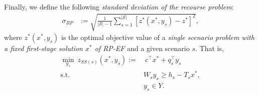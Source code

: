 Finally, we define the following \textit{standard deviation of the recourse problem}:
\begin{align} 
\sigma_{RP}&:=\sqrt{\frac{1}{|\mathcal{S}|-1}\sum_{s=1}^{|\mathcal{S}|}\left[z^*(x^*,y_s)-z^*\right]^2}, \label{sd}
\end{align}
where $z^*(x^*,y_s)$ is the optimal objective value of a \textit{single scenario problem with a fixed first-stage solution $x^*$ of RP-EF} and a given scenario $s$. That is,
\begin{subequations}
	\begin{align}
	\min_{y_s}\ z_{SS(s)}(x^*,y_s):=&\ c^\top x^*+q_s^\top y_s \label{ssp_ffs:obj}\\
	\mathrm{s.t.}\ &	W_s y_s\ge h_s-T_s x^*,  \label{ssp_ffs:b}\\
	&y_s \in Y. \label{ssp_ffs:c}
	\end{align}
\end{subequations}


